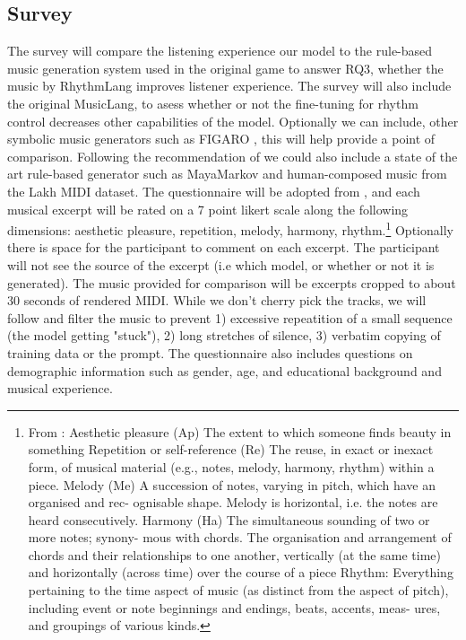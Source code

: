 \subsection{Survey}
The survey will compare the listening experience our model to the rule-based music generation system used in the original game to answer RQ3, whether the music by RhythmLang improves listener experience.  The survey will also include the original MusicLang, to asess whether or not the fine-tuning for rhythm control decreases other capabilities of the model. Optionally we can include, other symbolic music generators such as FIGARO \cite{Rütte_figaro_2023}, this will help provide a point of comparison. Following the recommendation of \cite{Yin_Reuben_Stepney_Collins_2023} we could also include a state of the art rule-based generator such as MayaMarkov \cite{Collins_Laney_2017} and human-composed music from the Lakh MIDI dataset. 
The questionnaire will be adopted from \cite{Yin_Reuben_Stepney_Collins_2023}, and each musical excerpt will be rated on a 7 point likert scale along the following dimensions: aesthetic pleasure, repetition, melody, harmony, rhythm.\footnote{From \cite{Yin_Reuben_Stepney_Collins_2023}: Aesthetic pleasure (Ap) The extent to which someone finds beauty in something 
Repetition or self-reference (Re) The reuse, in exact or inexact form, of musical material
(e.g., notes, melody, harmony, rhythm) within a piece.
Melody (Me) A succession of notes, varying in pitch, which have an organised and rec-
ognisable shape. Melody is horizontal, i.e. the notes are heard consecutively.
Harmony (Ha) The simultaneous sounding of two or more notes; synony-
mous with chords. The organisation and arrangement of chords and their relationships
to one another, vertically (at the same time) and horizontally (across time) over the
course of a piece
Rhythm: Everything pertaining to the time aspect of music (as distinct from the
aspect of pitch), including event or note beginnings and endings, beats, accents, meas-
ures, and groupings of various kinds.} 
Optionally there is space for the participant to comment on each excerpt. The participant will not see the source of the excerpt (i.e which model, or whether or not it is generated). 
The music provided for comparison will be excerpts cropped to about 30 seconds of rendered MIDI. While we don't cherry pick the tracks, we will follow \cite{Yin_Reuben_Stepney_Collins_2023} and filter the music to prevent 1) excessive repeatition of a small sequence (the model getting "stuck"), 2) long stretches of silence, 3) verbatim copying of training data or the prompt. 
The questionnaire also includes questions on demographic information such as gender, age, and educational background and musical experience.

